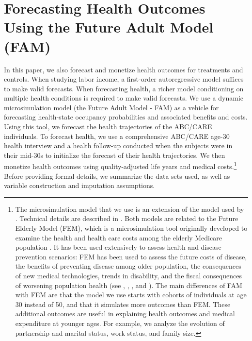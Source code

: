 \section{Forecasting Health Outcomes Using the Future Adult Model (FAM)} \label{appendix:health}

In this paper, we also forecast and monetize health outcomes for treatments and controls. When studying labor income, a first-order autoregressive model suffices to make valid forecasts. When forecasting health, a richer model conditioning on multiple health conditions is required to make valid forecasts. We use a dynamic microsimulation model (the Future Adult Model - FAM) as a vehicle for forecasting health-state occupancy probabilities and associated benefits and costs. Using this tool, we forecast the health trajectories of the ABC/CARE individuals. To forecast health, we use a comprehensive ABC/CARE age-30 health interview and a health follow-up conducted when the subjects were in their mid-30s to initialize the forecast of their health trajectories. We then monetize health outcomes using quality-adjusted life years and medical costs.\footnote{The  microsimulation model that we use is an extension of the model used by \citet{Prados_etal_2015_How-Much-Can-Education}. Technical details are described in \citet{Goldman_etal_2015_Future-Adult-Model}. Both models are related to the Future Elderly Model (FEM), which is a microsimulation tool originally developed to examine the health and health care costs among the elderly Medicare population \citep{Goldman_etal_2004_RAND-Report_Health-Status-Elderly}. It has been used extensively to assess health and disease prevention scenarios: FEM has been used to assess the future costs of disease, the benefits of preventing disease among older population, the consequences of new medical technologies, trends in disability, and the fiscal consequences of worsening population health (see \citet{Goldman_etal_2004_RAND-Report_Health-Status-Elderly}, \citet{Lakdawalla_etal_2004_Health-and-Cost}, \citet{Goldman_etal_2005_HA}, and \citet{Zissimopoulos_etal_2014_Delaying-Alzheimers}). The main differences of FAM with FEM are that the model we use starts with cohorts of individuals at age 30 instead of 50, and that it simulates more outcomes than FEM. These additional outcomes are useful in explaining health outcomes and medical expenditure at younger ages. For example, we analyze the evolution of partnership and marital status, work status, and family size.} Before providing formal details, we summarize the data sets used, as well as variable construction and imputation assumptions.


 